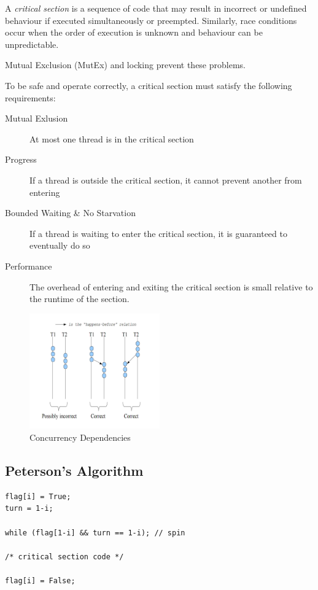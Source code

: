 \documentclass[a4]{article}
\begin{document}
A \emph{critical section} is a sequence of code that may result in
incorrect or undefined behaviour if executed simultaneously or
preempted. Similarly, race conditions occur when the order of execution
is unknown and behaviour can be unpredictable.

Mutual Exclusion (MutEx) and locking prevent these problems.

To be safe and operate correctly, a critical section must satisfy the
following requirements:

\begin{description}
\item[Mutual Exlusion]
At most one thread is in the critical section
\item[Progress]
If a thread is outside the critical section, it cannot prevent another
from entering
\item[Bounded Waiting \& No Starvation]
If a thread is waiting to enter the critical section, it is guaranteed
to eventually do so
\item[Performance]
The overhead of entering and exiting the critical section is small
relative to the runtime of the section.
\end{description}

\begin{figure}[h!]
  \centering
  \includegraphics[width=0.5\textwidth]{correctConcurrency}
  \caption{Concurrency Dependencies}
\end{figure}


\subsection{Peterson's Algorithm}\label{petersons-algorithm}

\begin{verbatim}
flag[i] = True;
turn = 1-i;

while (flag[1-i] && turn == 1-i); // spin

/* critical section code */

flag[i] = False;
\end{verbatim}
\end{document}
